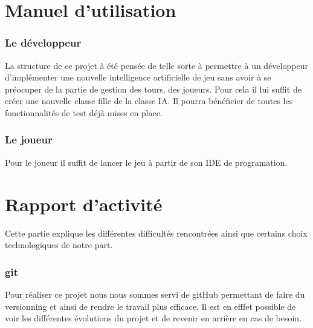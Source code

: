 \documentclass{report}
\begin{document}
	

\part{Manuel d'utilisation}
	\section{Le développeur}
	La structure de ce projet à été pensée de telle sorte à permettre à un développeur d'implémenter une nouvelle intelligence artificielle de jeu sans avoir à se préocuper de la partie de gestion des tours, des joueurs. Pour cela il lui suffit de créer une nouvelle classe fille de la classe IA. Il pourra bénéficier de toutes les fonctionnalités de test déjà mises en place.
	
	

	\section{Le joueur}
	Pour le joueur il suffit de lancer le jeu à partir de son IDE de programation. 

\part{Rapport d'activité}
Cette partie explique les différentes difficultés rencontrées ainsi que certains choix technologiques de notre part.
\section{git}
Pour réaliser ce projet nous nous sommes servi de gitHub permettant de faire du versionning et ainsi de rendre le travail plus efficace. Il est en efffet possible de voir les différentes évolutions du projet et de revenir en arrière en cas de besoin.
\end{document}
